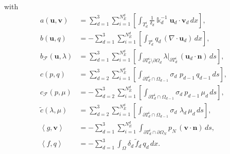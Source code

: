 with
\begin{align}
a\left(  \mathbf{u},\mathbf{v}\right)   &  =\sum_{d=1}^{3}\sum_{i=1}%
^{N_{E}^{d}}\left[  \int_{T_{d}^{i}}\frac{1}{\delta_{d}}\Bbbk_{d}%
^{-1}\mathbf{u}_{d}\cdot\mathbf{v}_{d}\,dx\right]  ,\label{eq:weak_term_a}\\
b\left(  \mathbf{u},q\right)   &  =-\sum_{d=1}^{3}\sum_{i=1}^{N_{E}^{d}%
}\left[  \int_{T_{d}^{i}}q_{d}\,\left(  \nabla\cdot\mathbf{u}_{d}\right)
\,dx\right]  ,\\
b_{\mathcal{F}}\left(  \mathbf{u},\lambda\right)   &  =\sum_{d=1}^{3}%
\sum_{i=1}^{N_{E}^{d}}\left[  \int_{\partial T_{d}^{i}\setminus\partial
\Omega_{d}}\lambda|_{\partial T_{d}^{i}}\,\left(  \mathbf{u}_{d}%
\cdot\mathbf{n}\right)  \,ds\right]  ,\\
c\left(  p,q\right)   &  =\sum_{d=2}^{3}\sum_{i=1}^{N_{E}^{d}%
}\left[  \int_{\partial T_{d}^{i}\cap\Omega_{d-1}}\sigma_{d}\,\,p_{d-1}%
\,q_{d-1}\,ds\right]  ,\label{eq:weak_term_cbar}\\
c_{\mathcal{F}}\left(  p,\mu\right)   &  =-\sum_{d=2}^{3}\sum_{i=1}^{N_{E}%
^{d}}\left[  \int_{\partial T_{d}^{i}\cap\Omega_{d-1}}\sigma_{d}\ p_{d-1}%
\,\mu_{d}\,ds\right]  ,\label{eq:weak_term_cF}\\
\widetilde{c}\left(  \lambda,\mu\right)   &  =\sum_{d=2}^{3}\sum_{i=1}%
^{N_{E}^{d}}\left[  \int_{\partial T_{d}^{i}\cap\Omega_{d-1}}\sigma
_{d}\,\,\lambda_{d}\,\mu_{d}\,ds\right]  ,\label{eq:weak_term_ctilde}\\
\left\langle g,\mathbf{v}\right\rangle  &  =-\sum_{d=1}^{3}\sum_{i=1}%
^{N_{E}^{d}}\int_{\partial T_{d}^{i}\cap\partial\Omega_{N}}p_{N}\,\left(
\mathbf{v}\cdot\mathbf{n}\right)  \,ds,\\
\left\langle f,q\right\rangle  &  =-\sum_{d=1}^{3}\int_{\Omega
}\delta_{d}\,\tilde{f}_{d}\,q_{d}\,dx. \label{eq:weak_term_f}%
\end{align}


